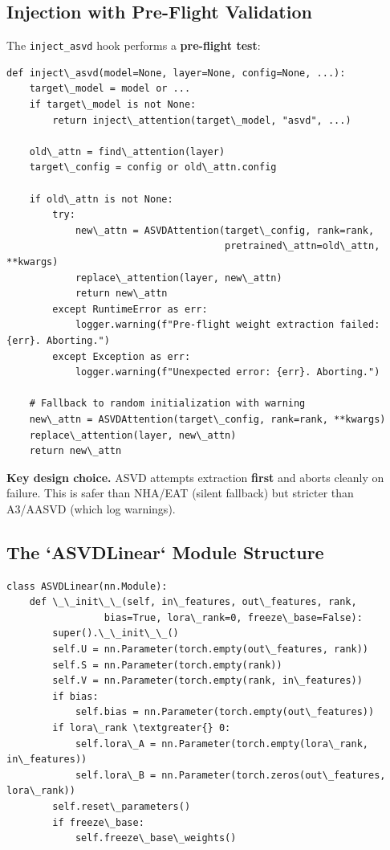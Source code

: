 \subsection{Injection with Pre-Flight Validation}

The \texttt{inject\_asvd} hook performs a \textbf{pre-flight test}:

\begin{lstlisting}
def inject\_asvd(model=None, layer=None, config=None, ...):
    target\_model = model or ...
    if target\_model is not None:
        return inject\_attention(target\_model, "asvd", ...)
    
    old\_attn = find\_attention(layer)
    target\_config = config or old\_attn.config
    
    if old\_attn is not None:
        try:
            new\_attn = ASVDAttention(target\_config, rank=rank,
                                      pretrained\_attn=old\_attn, **kwargs)
            replace\_attention(layer, new\_attn)
            return new\_attn
        except RuntimeError as err:
            logger.warning(f"Pre-flight weight extraction failed: {err}. Aborting.")
        except Exception as err:
            logger.warning(f"Unexpected error: {err}. Aborting.")
    
    # Fallback to random initialization with warning
    new\_attn = ASVDAttention(target\_config, rank=rank, **kwargs)
    replace\_attention(layer, new\_attn)
    return new\_attn
\end{lstlisting}

\textbf{Key design choice.} ASVD attempts extraction \textbf{first} and aborts 
cleanly on failure. This is safer than NHA/EAT (silent fallback) but 
stricter than A3/AASVD (which log warnings).

\subsection{The `ASVDLinear` Module Structure}

\begin{lstlisting}
class ASVDLinear(nn.Module):
    def \_\_init\_\_(self, in\_features, out\_features, rank,
                 bias=True, lora\_rank=0, freeze\_base=False):
        super().\_\_init\_\_()
        self.U = nn.Parameter(torch.empty(out\_features, rank))
        self.S = nn.Parameter(torch.empty(rank))
        self.V = nn.Parameter(torch.empty(rank, in\_features))
        if bias:
            self.bias = nn.Parameter(torch.empty(out\_features))
        if lora\_rank \textgreater{} 0:
            self.lora\_A = nn.Parameter(torch.empty(lora\_rank, in\_features))
            self.lora\_B = nn.Parameter(torch.zeros(out\_features, lora\_rank))
        self.reset\_parameters()
        if freeze\_base:
            self.freeze\_base\_weights()
\end{lstlisting}

